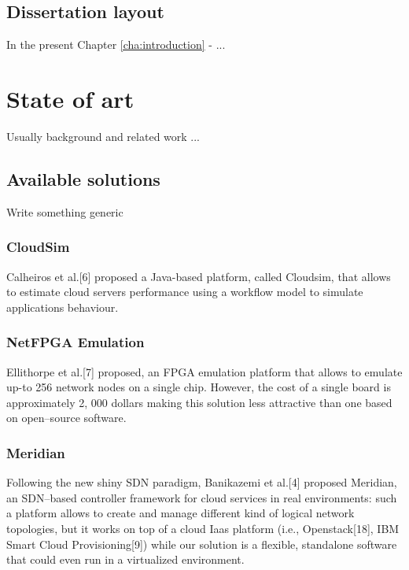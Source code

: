 \documentclass[12pt,english]{book}
\begin{document}
\section{Dissertation layout}

In the present Chapter \ref{cha:introduction} - ...

\chapter{State of art \label{cha:stateofart} }

Usually background and related work ...

\section{Available solutions}

Write something generic

\subsection{CloudSim}

Calheiros et al.[6] proposed a Java-based platform, called Cloudsim, that allows to estimate cloud servers performance using a workflow model to simulate applications behaviour. 

\subsection{NetFPGA Emulation}

Ellithorpe et al.[7] proposed, an FPGA emulation platform that allows to emulate up-to 256 network nodes on a single chip. However, the cost of a single board is approximately 2, 000 dollars making this solution less attractive than one based on open--source software.

\subsection{Meridian}

Following the new shiny SDN paradigm, Banikazemi et al.[4] proposed Meridian, an SDN--based controller
framework for cloud services in real environments: such a platform allows to create and manage different kind
of logical network topologies, but it works on top of a cloud Iaas platform (i.e., Openstack[18], IBM Smart
Cloud Provisioning[9]) while our solution is a flexible, standalone software that could even run in a virtualized environment.
\end{document}
